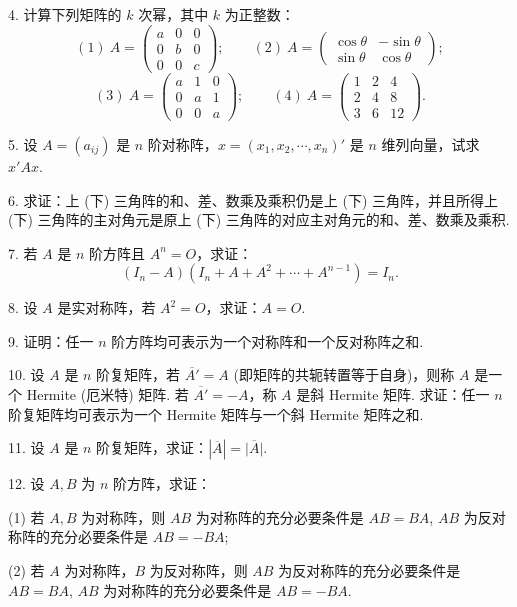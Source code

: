 \documentclass[UTF8, 12pt, fontset=fandol, oneside]{ctexart}
\begin{document}
4. 计算下列矩阵的 $k$ 次幂，其中 $k$ 为正整数：
\[
(1)\ A=\left(\begin{array}{ccc}
a & 0 & 0\\
0 & b & 0\\
0 & 0 & c
\end{array}\right);
\qquad
(2)\ A=\left(\begin{array}{cc}
\cos\theta & -\sin\theta\\
\sin\theta & \cos\theta
\end{array}\right);
\]
\[
(3)\ A=\left(\begin{array}{ccc}
a & 1 & 0\\
0 & a & 1\\
0 & 0 & a
\end{array}\right);
\qquad
(4)\ A=\left(\begin{array}{ccc}
1 & 2 & 4\\
2 & 4 & 8\\
3 & 6 & 12
\end{array}\right).
\]

5. 设 $A=(a_{ij})$ 是 $n$ 阶对称阵，$x=(x_1,x_2,\cdots,x_n)'$ 是 $n$ 维列向量，试求 $x'Ax$.

6. 求证：上 (下) 三角阵的和、差、数乘及乘积仍是上 (下) 三角阵，并且所得上 (下) 三角阵的主对角元是原上 (下) 三角阵的对应主对角元的和、差、数乘及乘积.

7. 若 $A$ 是 $n$ 阶方阵且 $A^n=O$，求证：
\[
(I_n-A)(I_n+A+A^2+\cdots+A^{n-1})=I_n.
\]

8. 设 $A$ 是实对称阵，若 $A^2=O$，求证：$A=O$.

9. 证明：任一 $n$ 阶方阵均可表示为一个对称阵和一个反对称阵之和.

10. 设 $A$ 是 $n$ 阶复矩阵，若 $\overline{A'}=A$ (即矩阵的共轭转置等于自身)，则称 $A$ 是一个 Hermite (厄米特) 矩阵. 若 $\overline{A'}=-A$，称 $A$ 是斜 Hermite 矩阵. 求证：任一 $n$ 阶复矩阵均可表示为一个 Hermite 矩阵与一个斜 Hermite 矩阵之和.

11. 设 $A$ 是 $n$ 阶复矩阵，求证：$|\overline{A}|=\overline{|A|}$.

12. 设 $A,B$ 为 $n$ 阶方阵，求证：

(1) 若 $A,B$ 为对称阵，则 $AB$ 为对称阵的充分必要条件是 $AB=BA$, $AB$ 为反对称阵的充分必要条件是 $AB=-BA$;

(2) 若 $A$ 为对称阵，$B$ 为反对称阵，则 $AB$ 为反对称阵的充分必要条件是 $AB=BA$, $AB$ 为对称阵的充分必要条件是 $AB=-BA$.
\end{document}
